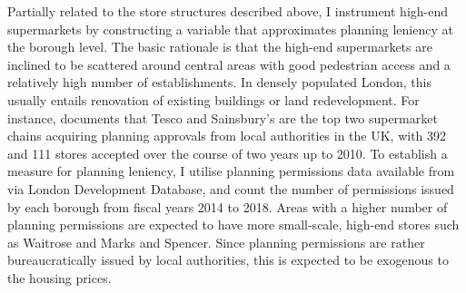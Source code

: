 \documentclass{article}
\begin{document}
Partially related to the store structures described above, I instrument high-end supermarkets by constructing a variable that approximates planning leniency at the borough level. The basic rationale is that the high-end supermarkets are inclined to be scattered around central areas with good pedestrian access and a relatively high number of establishments. In densely populated London, this usually entails renovation of existing buildings or land redevelopment. For instance, \citet{Hawkes2010BigDay} documents that Tesco and Sainsbury's are the top two supermarket chains acquiring planning approvals from local authorities in the UK, with 392 and 111 stores accepted over the course of two years up to 2010. To establish a measure for planning leniency, I utilise planning permissions data available from \citet{GreaterLondonAuthority2017PlanningDatabase} via London Development Database, and count the number of permissions issued by each borough from fiscal years 2014 to 2018. Areas with a higher number of planning permissions are expected to have more small-scale, high-end stores such as Waitrose and Marks and Spencer. Since planning permissions are rather bureaucratically issued by local authorities, this is expected to be exogenous to the housing prices.
\end{document}

